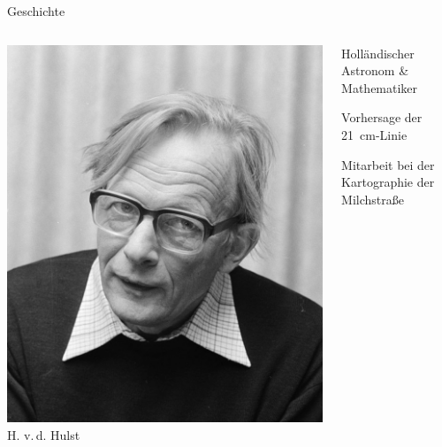\documentclass[compress, aspectratio=169]{beamer}
\begin{document}
\begin{frame}{Geschichte}%
  \begin{columns}[c, onlytextwidth]%
      \centering
      \includegraphics[width=\linewidth]{./images/Hendrik_vanDeHulst.jpg}
      \newline H. v.\,d. Hulst
      \begin{description}
        \item[Hendrik van de Hulst] Holländischer Astronom \& Mathematiker
        \item[1944] Vorhersage der \SI{21}{\centi\meter}-Linie
        \item[später] Mitarbeit bei der Kartographie der Milchstraße
      \end{description}
  \end{columns}%
  \vfill
  \begin{columns}[c, onlytextwidth]%
      \centering

\end{columns}
\end{frame}
\end{document}
